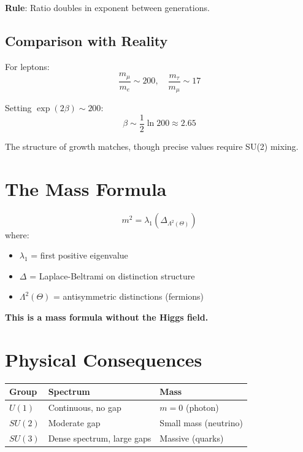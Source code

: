 \textbf{Rule}: Ratio doubles in exponent between generations.

\subsection{Comparison with Reality}

For leptons:
\begin{equation}
\frac{m_\mu}{m_e} \sim 200, \quad \frac{m_\tau}{m_\mu} \sim 17
\end{equation}

Setting $\exp(2\beta) \sim 200$:
\begin{equation}
\beta \sim \frac{1}{2}\ln 200 \approx 2.65
\end{equation}

The structure of growth matches, though precise values require SU(2) mixing.

\section{The Mass Formula}

\begin{theorem}
\begin{equation}
\boxed{m^2 = \lambda_1(\Delta_{\Lambda^2(\Theta)})}
\end{equation}
where:
\begin{itemize}
    \item $\lambda_1$ = first positive eigenvalue
    \item $\Delta$ = Laplace-Beltrami on distinction structure
    \item $\Lambda^2(\Theta)$ = antisymmetric distinctions (fermions)
\end{itemize}
\end{theorem}

\textbf{This is a mass formula without the Higgs field.}

\section{Physical Consequences}

\begin{center}
\begin{tabular}{@{}lll@{}}
\toprule
\textbf{Group} & \textbf{Spectrum} & \textbf{Mass} \\
\midrule
$U(1)$ & Continuous, no gap & $m = 0$ (photon) \\
$SU(2)$ & Moderate gap & Small mass (neutrino) \\
$SU(3)$ & Dense spectrum, large gaps & Massive (quarks) \\
\bottomrule
\end{tabular}
\end{center}

